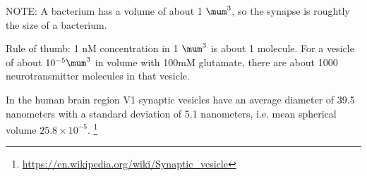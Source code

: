 \begin{mdframed}

NOTE: A bacterium has a volume of about 1 $\mum^3$, so the synapse is roughtly
the size of a bacterium.

Rule of thumb: 1 nM concentration in 1 $\mum^3$ is about 1 molecule.
For a vesicle of about $10^{-5} \mum^3$ in volume with 100mM glutamate, there
are about 1000 neurotransmitter molecules in that vesicle. 

\end{mdframed}

In the human brain region V1 synaptic vesicles have an average diameter of 39.5
nanometers with a standard deviation of 5.1 nanometers, i.e. mean spherical
volume $25.8 \times 10^{-5}$.
\footnote{\url{https://en.wikipedia.org/wiki/Synaptic_vesicle}}


